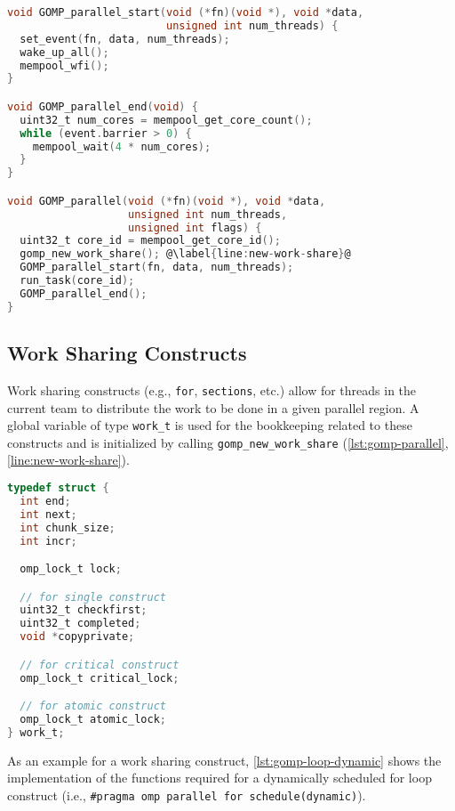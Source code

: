 \begin{lstlisting}[language=C, caption={GOMP\_parallel Implementation}, label={lst:gomp-parallel},
                   escapechar=@]
void GOMP_parallel_start(void (*fn)(void *), void *data,
                         unsigned int num_threads) {
  set_event(fn, data, num_threads);
  wake_up_all();
  mempool_wfi();
}

void GOMP_parallel_end(void) {
  uint32_t num_cores = mempool_get_core_count();
  while (event.barrier > 0) {
    mempool_wait(4 * num_cores);
  }
}

void GOMP_parallel(void (*fn)(void *), void *data,
                   unsigned int num_threads,
                   unsigned int flags) {
  uint32_t core_id = mempool_get_core_id();
  gomp_new_work_share(); @\label{line:new-work-share}@
  GOMP_parallel_start(fn, data, num_threads);
  run_task(core_id);
  GOMP_parallel_end();
}
\end{lstlisting}

\subsection{Work Sharing Constructs}
\label{subsec:work_sharing_constructs}

Work sharing constructs (e.g., \texttt{for}, \texttt{sections}, etc.) allow for threads in the
current team to distribute the work to be done in a given parallel region. A global variable of type
\texttt{work\_t} is used for the bookkeeping related to these constructs and is initialized by
calling \texttt{gomp_new\_work\_share} (\cref{lst:gomp-parallel}, \cref{line:new-work-share}).

\begin{lstlisting}[language=C, caption={work_t Struct}, label={lst:work-t}]
typedef struct {
  int end;
  int next;
  int chunk_size;
  int incr;

  omp_lock_t lock;

  // for single construct
  uint32_t checkfirst;
  uint32_t completed;
  void *copyprivate;

  // for critical construct
  omp_lock_t critical_lock;

  // for atomic construct
  omp_lock_t atomic_lock;
} work_t;
\end{lstlisting}

As an example for a work sharing construct, \cref{lst:gomp-loop-dynamic} shows the implementation of
the functions required for a dynamically scheduled for loop construct (i.e., \texttt{\#pragma omp
parallel for schedule(dynamic)}).

